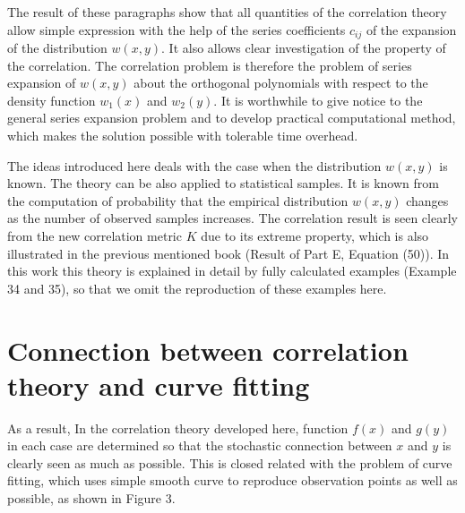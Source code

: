 \documentclass{article}
\begin{document}
The result of these paragraphs show that all quantities of
the correlation theory allow simple expression with the help of the
series coefficients $c_{ij}$ of the expansion of the distribution
$w(x,y)$. It also allows clear investigation of
the property of the correlation.
The correlation problem is therefore the problem of series
expansion of $w(x,y)$ about the orthogonal polynomials with
respect to the density function 
$w_1(x)$ and $w_2(y)$.
It is worthwhile to give notice to the 
general series expansion problem and to develop
practical computational method, which makes the solution
possible with tolerable time overhead.

The ideas introduced here deals with the case when
the distribution $w(x,y)$ is known. The theory can be also
applied to statistical samples. It is known from the computation of probability that the empirical distribution $w(x,y)$ changes as the number of observed
samples increases. The correlation result is seen clearly from the new correlation metric $K$ due to its
extreme property, which is also illustrated in the previous mentioned book (Result of Part E, Equation (50)).
In this work this theory is explained in detail by fully calculated
examples (Example 34 and 35), so that we omit the reproduction of these examples here.
\section{Connection between correlation theory and curve fitting}
As a result, In the correlation theory developed here, function $f(x)$ and $g(y)$ in each case are determined so that the stochastic connection between $x$
and $y$ is clearly seen as much as possible. This is closed related with the problem of curve
fitting, which uses simple smooth curve to reproduce observation points as well as possible, as shown in Figure 3.
\end{document}
